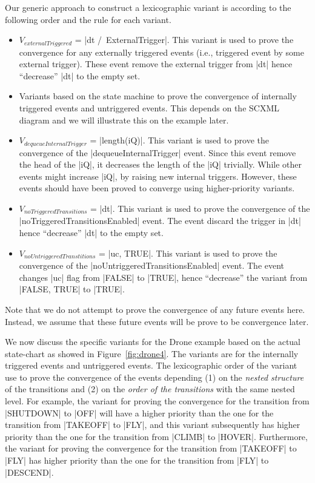 Our generic approach to construct a lexicographic variant is according
to the following order and the rule for each variant.
\begin{itemize}
\item $V_{externalTriggered}$ = |dt /\ ExternalTrigger|.  This variant
  is used to prove the convergence for any externally triggered events
  (i.e., triggered event by some external trigger). These event remove
  the external trigger from |dt| hence ``decrease'' |dt| to the empty
  set.

\item Variants based on the state machine to prove the convergence of
  internally triggered events and untriggered events.  This depends on
  the SCXML diagram and we will illustrate this on the example later.
  
\item $V_{dequeueInternalTrigger}$ = |length(iQ)|.  This variant is
  used to prove the convergence of the |dequeueInternalTrigger| event.
  Since this event remove the head of the |iQ|, it decreases the
  length of the |iQ| trivially.  While other events might increase
  |iQ|, by raising new internal triggers. However, these events should
  have been proved to converge using higher-priority variants.
  
\item $V_{noTriggeredTransitions}$ = |dt|.  This variant is used to
  prove the convergence of the |noTriggeredTransitionsEnabled| event.
  The event discard the trigger in |dt| hence ``decrease'' |dt| to the
  empty set.
  
\item $V_{noUntriggeredTranstitions}$ = |{uc, TRUE}|.  This variant is
  used to prove the convergence of the
  |noUntriggeredTransitionsEnabled| event.  The event changes |uc|
  flag from |FALSE| to |TRUE|, hence ``decrease'' the variant from
  |{FALSE, TRUE}| to |{TRUE}|.
\end{itemize}
Note that we do not attempt to prove the convergence of any future
events here. Instead, we assume that these future events will be prove
to be convergence later.

We now discuss the specific variants for the Drone example based on
the actual state-chart as showed in Figure~\ref{fig:drone4}.  The
variants are for the internally triggered events and untriggered
events. The lexicographic order of the variant use to prove the
convergence of the events depending (1) on the \emph{nested structure}
of the transitions and (2) on the \emph{order of the transitions} with
the same nested level.  For example, the variant for proving the
convergence for the transition from |SHUTDOWN| to |OFF| will have a
higher priority than the one for the transition from |TAKEOFF| to
|FLY|, and this variant subsequently has higher priority than the one
for the transition from |CLIMB| to |HOVER|.  Furthermore, the variant
for proving the convergence for the transition from |TAKEOFF| to |FLY|
has higher priority than the one for the transition from |FLY| to
|DESCEND|.

